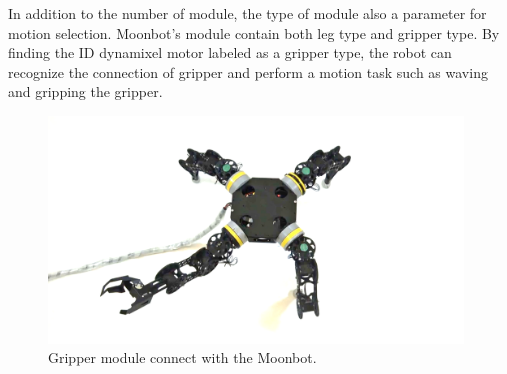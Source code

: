 \begin{enumerate}
\end{enumerate}

In addition to the number of module, the type of module also a parameter for motion selection. Moonbot's module contain both leg type and gripper type. By finding the ID dynamixel motor labeled as a gripper type, the robot can recognize the connection of gripper and perform a motion task such as waving and gripping the gripper.\\

\begin{figure}[h]
  \centering
  \includegraphics[width=110mm]{./fig/moonbot/grippermoonbot.png}
  \vspace{2mm}
  \caption{Gripper module connect with the Moonbot.}\label{Moonbot gripper}
\end{figure}

